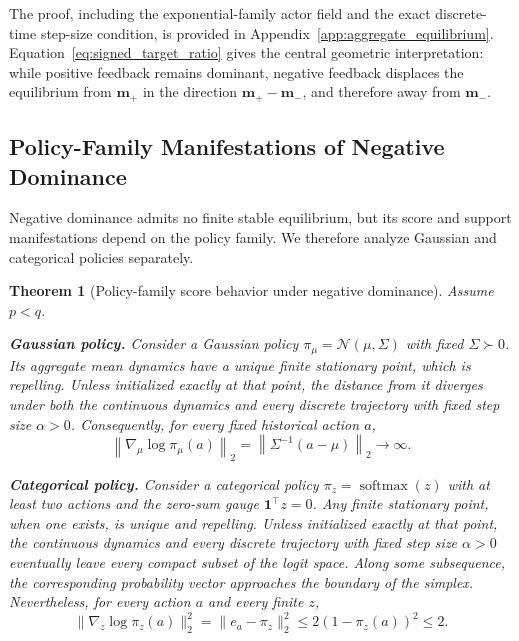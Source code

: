 \documentclass{article}
\theoremstyle{plain}
\newtheorem{theorem}{Theorem}[section]
\theoremstyle{definition}
\theoremstyle{remark}
\begin{document}
The proof, including the exponential-family actor field and the exact
discrete-time step-size condition, is provided in
Appendix~\ref{app:aggregate_equilibrium}.
Equation~\eqref{eq:signed_target_ratio} gives the central geometric
interpretation: while positive feedback remains dominant, negative
feedback displaces the equilibrium from \(\mathbf m_+\) in the direction
\(\mathbf m_+-\mathbf m_-\), and therefore away from
\(\mathbf m_-\).

\subsection{Policy-Family Manifestations of Negative Dominance}
\label{sec:policy_family_manifestations}

Negative dominance admits no finite stable equilibrium, but its score
and support manifestations depend on the policy family. We therefore
analyze Gaussian and categorical policies separately.

\begin{theorem}[Policy-family score behavior under negative dominance]
\label{thm:policy_family_manifestations}
Assume \(p<q\).

\textbf{Gaussian policy.}
Consider a Gaussian policy
\(\pi_\mu=\mathcal N(\mu,\Sigma)\) with fixed
\(\Sigma\succ0\). Its aggregate mean dynamics have a unique finite
stationary point, which is repelling. Unless initialized exactly at that
point, the distance from it diverges under both the continuous dynamics
and every discrete trajectory with fixed step size \(\alpha>0\).
Consequently, for every fixed historical action \(a\),
\begin{equation}
    \left\|
        \nabla_\mu\log\pi_\mu(a)
    \right\|_2
    =
    \left\|
        \Sigma^{-1}(a-\mu)
    \right\|_2
    \longrightarrow
    \infty.
    \label{eq:gaussian_unbounded_score}
\end{equation}

\textbf{Categorical policy.}
Consider a categorical policy
\(\pi_z=\operatorname{softmax}(z)\) with at least two actions and the
zero-sum gauge \(\mathbf 1^\top z=0\). Any finite stationary point, when
one exists, is unique and repelling. Unless initialized exactly at that
point, the continuous dynamics and every discrete trajectory with fixed
step size \(\alpha>0\) eventually leave every compact subset of the
logit space. Along some subsequence, the corresponding probability
vector approaches the boundary of the simplex. Nevertheless, for every
action \(a\) and every finite \(z\),
\begin{equation}
\|\nabla_z\log\pi_z(a)\|_2^2
=
\|e_a-\pi_z\|_2^2
\le 2(1-\pi_z(a))^2
\le 2.
\label{eq:categorical_bounded_score}
\end{equation}
\end{theorem}
\end{document}
